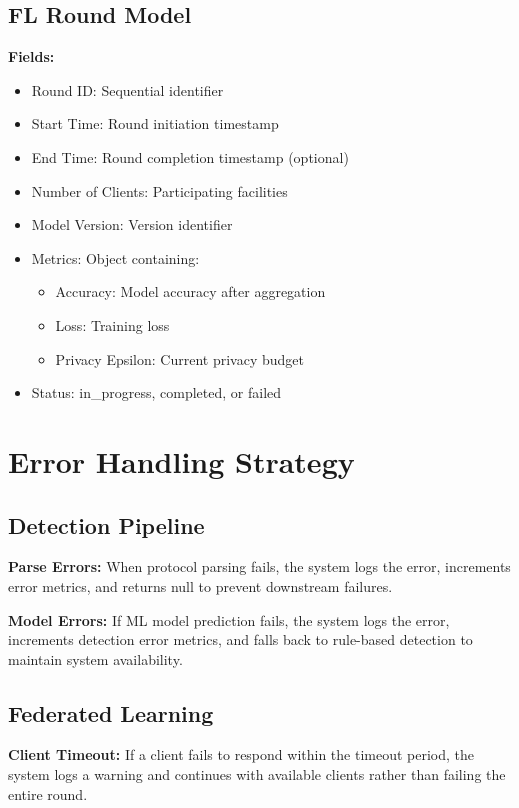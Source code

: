 \documentclass[12pt,a4paper]{article}
\begin{document}
\subsection{FL Round Model}

\textbf{Fields:}
\begin{itemize}[leftmargin=1cm,itemsep=0pt]
    \item Round ID: Sequential identifier
    \item Start Time: Round initiation timestamp
    \item End Time: Round completion timestamp (optional)
    \item Number of Clients: Participating facilities
    \item Model Version: Version identifier
    \item Metrics: Object containing:
    \begin{itemize}
        \item Accuracy: Model accuracy after aggregation
        \item Loss: Training loss
        \item Privacy Epsilon: Current privacy budget
    \end{itemize}
    \item Status: in\_progress, completed, or failed
\end{itemize}

\section{Error Handling Strategy}

\subsection{Detection Pipeline}

\textbf{Parse Errors:}
When protocol parsing fails, the system logs the error, increments error metrics, and returns null to prevent downstream failures.

\textbf{Model Errors:}
If ML model prediction fails, the system logs the error, increments detection error metrics, and falls back to rule-based detection to maintain system availability.

\subsection{Federated Learning}

\textbf{Client Timeout:}
If a client fails to respond within the timeout period, the system logs a warning and continues with available clients rather than failing the entire round.
\end{document}
